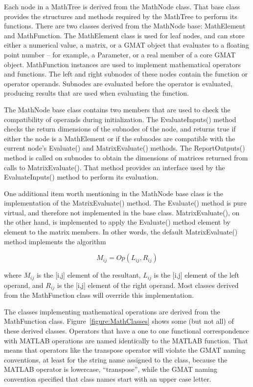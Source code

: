 Each node in a MathTree is derived from the MathNode class.  That base class
provides the structures and methods required by the MathTree to perform its
functions.  There are two classes derived from the MathNode base: MathElement
and MathFunction.  The MathElement class is used for leaf nodes, and can store
either a numerical value, a matrix, or a GMAT object that evaluates to a
floating point number -- for example, a Parameter, or a real member of a core
GMAT object.  MathFunction instances are used to implement mathematical
operators and functions.  The left and right subnodes of these nodes contain
the function or operator operands.  Subnodes are evaluated before the operator
is evaluated, producing results that are used when evaluating the function.

The MathNode base class contains two members that are used to check the
compatibility of operands during initialization.  The EvaluateInputs() method
checks the return dimensions of the subnodes of the node, and returns true if
either the node is a MathElement or if the subnodes are compatible with the
current node's Evaluate() and MatrixEvaluate() methods.  The ReportOutputs()
method is called on subnodes to obtain the dimensions of matrices returned from calls to
MatrixEvaluate().  That method provides an interface used by the
EvaluateInputs() method to perform its evaluation.

One additional item worth mentioning in the MathNode base class is the
implementation of the MatrixEvaluate() method.  The Evaluate() method is pure
virtual, and therefore not implemented in the base class.  MatrixEvaluate(), on the other hand, is
implemented to apply the Evaluate() method element by
element to the matrix members.  In other words, the default MatrixEvaluate()
method implements the algorithm

\begin{equation}\label{eq:mathDefaultMatrixCalc}
M_{ij} = Op(L_{ij},R_{ij})
\end{equation}

\noindent where $M_{ij}$ is the [i,j] element of the resultant, $L_{ij}$ is the
[i,j] element of the left operand, and $R_{ij}$ is the [i,j] element of the
right operand.  Most classes derived from the MathFunction class will override
this implementation.

The classes implementing mathematical operations are derived from the MathFunction class.
Figure~\ref{figure:MathClasses} shows some (but not all) of these derived classes.  Operators that
have a one to one functional correspondence with MATLAB operations are named identically to the
MATLAB function.  That means that operators like the transpose operator will violate the GMAT naming
conventions, at least for the string name assigned to the class, because the MATLAB operator is
lowercase, ``transpose'', while the GMAT naming convention specified that class names start with an
upper case letter.

